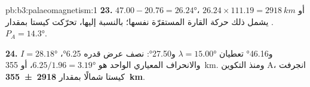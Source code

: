\begin{solution}{pb:b3:palaeomagnetism:1}
\textbf{23.} $47.00 - 20.76 = \ang{26.24}$، أو $26.24\times111.19 =
\qty{2918}{km}$. يشمل ذلك حركة القارة المستقرّة نفسها؛
بالنسبة إليها، تحرّكت كيستا بمقدار $P_A = \ang{14.3}$.

\textbf{24.} $I = \ang{28.18}$ و\ang{46.16} تعطيان $\lambda = \ang{15.00}$
و\ang{27.50}: نصف عرض قدره \ang{6.25}، والانحراف المعياري الواحد
هو $6.25/1.96 = \ang{3.19}$، أو \qty{355}{km}. ومنذ التكوين A، انجرفت كيستا
شمالًا بمقدار
\textbf{\qty[text-series-to-math=true]{2918 \pm 355}{km}}.
\end{solution}
